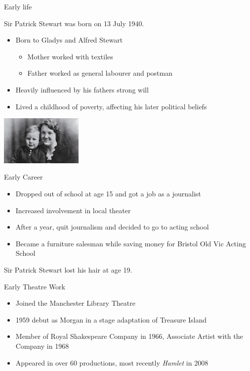 \documentclass[xcolor=dvipsnames]{beamer}
\begin{document}
\begin{frame}{Early life}
  \begin{fct}
    Sir Patrick Stewart was born on 13 July 1940.
  \end{fct}
  \begin{itemize}
    \item Born to Gladys and Alfred Stewart
    \begin{itemize}
      \item Mother worked with textiles
      \item Father worked as general labourer and postman
    \end{itemize}
    \item Heavily influenced by his fathers strong will
    \item Lived a childhood of poverty, affecting his later political beliefs
  \end{itemize}
  \begin{center}
    \includegraphics[width=0.3\textwidth]{kid.jpg}
  \end{center}
\end{frame}

\begin{frame}{Early Career}
  \begin{itemize}
    \item Dropped out of school at age 15 and got a job as a journalist
    \item Increased involvement in local theater
    \item After a year, quit journalism and decided to go to acting school
    \item Became a furniture salesman while saving money for Bristol Old Vic
    Acting School
  \end{itemize}
  \begin{fct}
    Sir Patrick Stewart lost his hair at age 19.
  \end{fct}
\end{frame}

\begin{frame}{Early Theatre Work}
  \begin{itemize}
    \item Joined the Manchester Library Theatre
    \item 1959 debut as Morgan in a stage adaptation of Treasure Island
    \item Member of Royal Shakespeare Company in 1966, Associate Artist with the Company in 1968
    \item Appeared in over 60 productions, most recently \emph{Hamlet} in 2008
  \end{itemize}
\end{frame}
\end{document}
